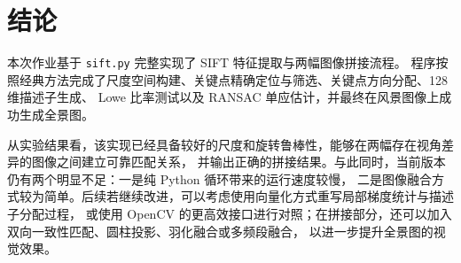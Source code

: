 \documentclass[12pt,hyperref,a4paper,UTF8]{ctexart}
\begin{document}
\section{结论}
本次作业基于 \verb|sift.py| 完整实现了 SIFT 特征提取与两幅图像拼接流程。
程序按照经典方法完成了尺度空间构建、关键点精确定位与筛选、关键点方向分配、128 维描述子生成、
Lowe 比率测试以及 RANSAC 单应估计，并最终在风景图像上成功生成全景图。

从实验结果看，该实现已经具备较好的尺度和旋转鲁棒性，能够在两幅存在视角差异的图像之间建立可靠匹配关系，
并输出正确的拼接结果。与此同时，当前版本仍有两个明显不足：一是纯 Python 循环带来的运行速度较慢，
二是图像融合方式较为简单。后续若继续改进，可以考虑使用向量化方式重写局部梯度统计与描述子分配过程，
或使用 OpenCV 的更高效接口进行对照；在拼接部分，还可以加入双向一致性匹配、圆柱投影、羽化融合或多频段融合，
以进一步提升全景图的视觉效果。



\end{document}
